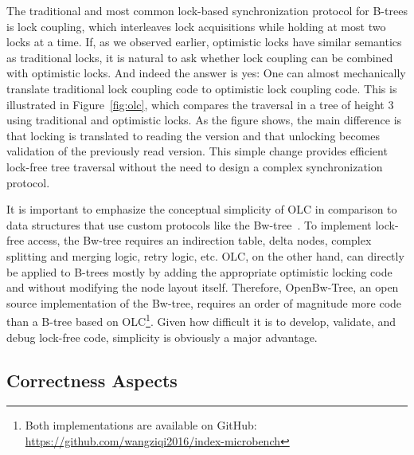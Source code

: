 \documentclass[11pt]{article}
\begin{document}
The traditional and most common lock-based synchronization protocol for B-trees is lock coupling, which interleaves lock acquisitions while holding at most two locks at a time.
If, as we observed earlier, optimistic locks have similar semantics as traditional locks, it is natural to ask whether lock coupling can be combined with optimistic locks.
And indeed the answer is yes: One can almost mechanically translate traditional lock coupling code to optimistic lock coupling code.
This is illustrated in Figure~\ref{fig:olc}, which compares the traversal in a tree of height 3 using traditional and optimistic locks.
As the figure shows, the main difference is that locking is translated to reading the version and that unlocking becomes validation of the previously read version.
This simple change provides efficient lock-free tree traversal without the need to design a complex synchronization protocol.

It is important to emphasize the conceptual simplicity of OLC in comparison to data structures that use custom protocols like the Bw-tree~\cite{DBLP:conf/icde/LevandoskiLS13a}.
To implement lock-free access, the Bw-tree requires an indirection table, delta nodes, complex splitting and merging logic, retry logic, etc.
OLC, on the other hand, can directly be applied to B-trees mostly by adding the appropriate optimistic locking code and without modifying the node layout itself.
Therefore, OpenBw-Tree, an open source implementation of the Bw-tree, requires an order of magnitude more code than a B-tree based on OLC\footnote{Both implementations are available on GitHub: \url{https://github.com/wangziqi2016/index-microbench}}.
Given how difficult it is to develop, validate, and debug lock-free code, simplicity is obviously a major advantage.

\subsection{Correctness Aspects}
\end{document}
